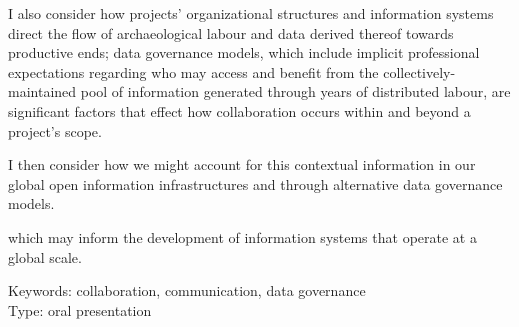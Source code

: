 \documentclass[a4paper]{article}
\begin{document}
I also consider how projects' organizational structures and information systems direct the flow of archaeological labour and data derived thereof towards productive ends; data governance models, which include implicit professional expectations regarding who may access and benefit from the collectively-maintained pool of information generated through years of distributed labour, are significant factors that effect how collaboration occurs within and beyond a project's scope.



I then consider how we might account for this contextual information in our global open information infrastructures and through alternative data governance models.

which may inform the development of information systems that operate at a global scale.


\hspace{10pt}

\normalsize
\noindent
Keywords: collaboration, communication, data governance\\
Type: oral presentation

\printbibliography
\end{document}
